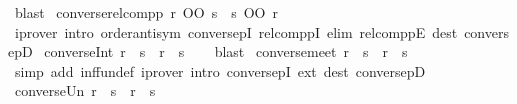 \begin{isabellebody}
\ blast%
\endisatagproof
{\isafoldproof}%
%
\isadelimproof
\isanewline
%
\endisadelimproof
\isanewline
{}\isamarkupfalse%
\ converse{\isacharunderscore}{\kern0pt}relcompp{\isacharcolon}{\kern0pt}\ {\isachardoublequoteopen}{\isacharparenleft}{\kern0pt}r\ OO\ s{\isacharparenright}{\kern0pt}{\isasyminverse}{\isasyminverse}\ {\isacharequal}{\kern0pt}\ s{\isasyminverse}{\isasyminverse}\ OO\ r{\isasyminverse}{\isasyminverse}{\isachardoublequoteclose}\isanewline
%
\isadelimproof
\ \ %
\endisadelimproof
%
\isatagproof
{}\isamarkupfalse%
\ {\isacharparenleft}{\kern0pt}iprover\ intro{\isacharcolon}{\kern0pt}\ order{\isacharunderscore}{\kern0pt}antisym\ conversepI\ relcomppI\ elim{\isacharcolon}{\kern0pt}\ relcomppE\ dest{\isacharcolon}{\kern0pt}\ conversepD{\isacharparenright}{\kern0pt}%
\endisatagproof
{\isafoldproof}%
%
\isadelimproof
\isanewline
%
\endisadelimproof
\isanewline
{}\isamarkupfalse%
\ converse{\isacharunderscore}{\kern0pt}Int{\isacharcolon}{\kern0pt}\ {\isachardoublequoteopen}{\isacharparenleft}{\kern0pt}r\ {\isasyminter}\ s{\isacharparenright}{\kern0pt}{\isasyminverse}\ {\isacharequal}{\kern0pt}\ r{\isasyminverse}\ {\isasyminter}\ s{\isasyminverse}{\isachardoublequoteclose}\isanewline
%
\isadelimproof
\ \ %
\endisadelimproof
%
\isatagproof
{}\isamarkupfalse%
\ blast%
\endisatagproof
{\isafoldproof}%
%
\isadelimproof
\isanewline
%
\endisadelimproof
\isanewline
{}\isamarkupfalse%
\ converse{\isacharunderscore}{\kern0pt}meet{\isacharcolon}{\kern0pt}\ {\isachardoublequoteopen}{\isacharparenleft}{\kern0pt}r\ {\isasymsqinter}\ s{\isacharparenright}{\kern0pt}{\isasyminverse}{\isasyminverse}\ {\isacharequal}{\kern0pt}\ r{\isasyminverse}{\isasyminverse}\ {\isasymsqinter}\ s{\isasyminverse}{\isasyminverse}{\isachardoublequoteclose}\isanewline
%
\isadelimproof
\ \ %
\endisadelimproof
%
\isatagproof
{}\isamarkupfalse%
\ {\isacharparenleft}{\kern0pt}simp\ add{\isacharcolon}{\kern0pt}\ inf{\isacharunderscore}{\kern0pt}fun{\isacharunderscore}{\kern0pt}def{\isacharparenright}{\kern0pt}\ {\isacharparenleft}{\kern0pt}iprover\ intro{\isacharcolon}{\kern0pt}\ conversepI\ ext\ dest{\isacharcolon}{\kern0pt}\ conversepD{\isacharparenright}{\kern0pt}%
\endisatagproof
{\isafoldproof}%
%
\isadelimproof
\isanewline
%
\endisadelimproof
\isanewline
{}\isamarkupfalse%
\ converse{\isacharunderscore}{\kern0pt}Un{\isacharcolon}{\kern0pt}\ {\isachardoublequoteopen}{\isacharparenleft}{\kern0pt}r\ {\isasymunion}\ s{\isacharparenright}{\kern0pt}{\isasyminverse}\ {\isacharequal}{\kern0pt}\ r{\isasyminverse}\ {\isasymunion}\ s{\isasyminverse}{\isachardoublequoteclose}\isanewline

\end{isabellebody}
